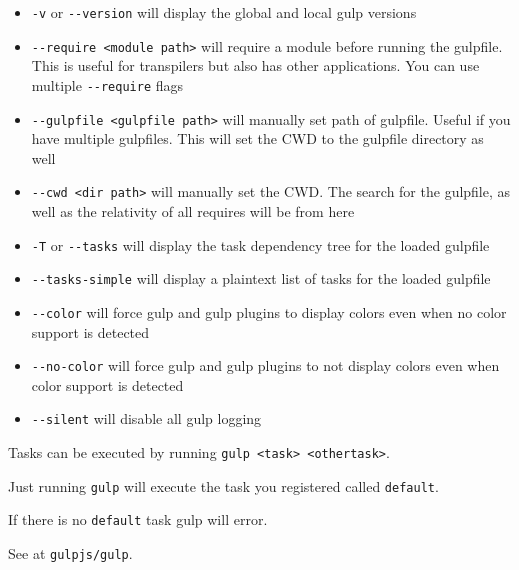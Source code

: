 \begin{itemize}
\item \verb|-v| or \verb|--version| will display the global and local gulp versions
\item \verb|--require <module path>| will require a module before running the gulpfile. This is useful for transpilers but also has other applications. You can use multiple \verb|--require| flags
\item \verb|--gulpfile <gulpfile path>| will manually set path of gulpfile. Useful if you have multiple gulpfiles. This will set the CWD to the gulpfile directory as well
\item \verb|--cwd <dir path>| will manually set the CWD. The search for the gulpfile, as well as the relativity of all requires will be from here
\item \verb|-T| or \verb|--tasks| will display the task dependency tree for the loaded gulpfile
\item \verb|--tasks-simple| will display a plaintext list of tasks for the loaded gulpfile
\item \verb|--color| will force gulp and gulp plugins to display colors even when no color support is detected
\item \verb|--no-color| will force gulp and gulp plugins to not display colors even when color support is detected
\item \verb|--silent| will disable all gulp logging
\end{itemize}


Tasks can be executed by running \verb|gulp <task> <othertask>|. 

Just running \verb|gulp| will execute the task you registered called \verb|default|. 

If there is no \verb|default| task gulp will error.

See 
 at \verb|gulpjs/gulp|.


